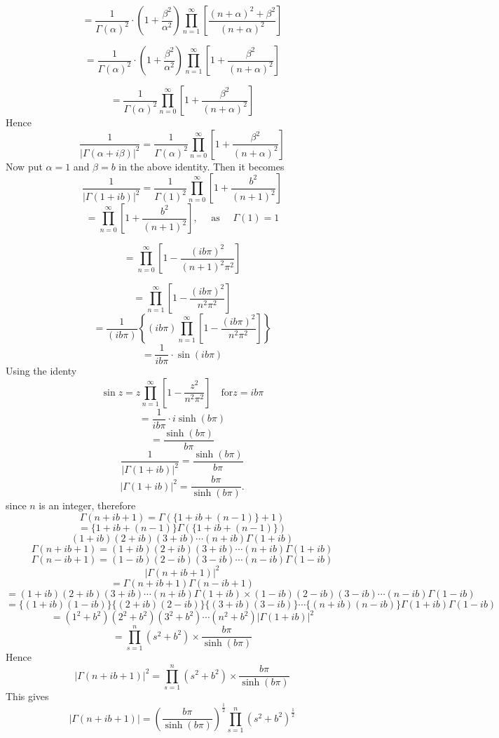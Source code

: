 \documentclass{article}
\begin{document}
\begin{flushleft}
$$
=\frac{1}{\Gamma(\alpha)^{2}} \cdot\left(1+\frac{\beta^{2}}{\alpha^{2}}\right) \prod_{n=1}^{\infty}\left[\frac{(n+\alpha)^{2}+\beta^{2}}{(n+\alpha)^{2}}\right]
$$

$$
=\frac{1}{\Gamma(\alpha)^{2}} \cdot\left(1+\frac{\beta^{2}}{\alpha^{2}}\right) \prod_{n=1}^{\infty}\left[1+\frac{\beta^{2}}{(n+\alpha)^{2}}\right]
$$

$$
=\frac{1}{\Gamma(\alpha)^{2}} \prod_{n=0}^{\infty}\left[1+\frac{\beta^{2}}{(n+\alpha)^{2}}\right]
$$
Hence
$$
\frac{1}{|\Gamma(\alpha+i \beta)|^{2}}=\frac{1}{\Gamma(\alpha)^{2}} \prod_{n=0}^{\infty}\left[1+\frac{\beta^{2}}{(n+\alpha)^{2}}\right]
$$
Now put $\alpha=1$ and $\beta=b$ in the above identity. Then it becomes
$$
\frac{1}{|\Gamma(1+i b)|^{2}}=\frac{1}{\Gamma(1)^{2}} \prod_{n=0}^{\infty}\left[1+\frac{b^{2}}{(n+1)^{2}}\right]
$$
$$
=\prod_{n=0}^{\infty}\left[1+\frac{b^{2}}{(n+1)^{2}}\right], \quad \text { as } \quad \Gamma(1)=1
$$

$$
=\prod_{n=0}^{\infty}\left[1-\frac{(i b \pi)^{2}}{(n+1)^{2} \pi^{2}}\right]
$$

$$
=\prod_{n=1}^{\infty}\left[1-\frac{(i b \pi)^{2}}{n^{2} \pi^{2}}\right]
$$
$$
=\frac{1}{(i b \pi)}\left\{(i b \pi) \prod_{n=1}^{\infty}\left[1-\frac{(i b \pi)^{2}}{n^{2} \pi^{2}}\right]\right\}
$$
$$
=\frac{1}{i b \pi} \cdot \sin (i b \pi)
$$
Using the identy
$$
\sin z=z \prod_{n=1}^{\infty}\left[1-\frac{z^{2}}{n^{2} \pi^{2}}\right] \quad \text{for} z=ib\pi
$$
$$=\frac{1}{i b \pi} \cdot i \sinh (b \pi)$$
$$=\frac{\sinh (b \pi)}{b \pi}$$
$$\frac{1}{|\Gamma(1+i b)|^{2}}=\frac{\sinh (b \pi)}{b \pi}$$
$$|\Gamma(1+i b)|^{2}=\frac{b \pi}{\sinh (b \pi)} .$$
since $n$ is an integer, therefore
$$\Gamma(n+i b+1)=\Gamma(\{1+i b+(n-1)\}+1)$$
$$=\{1+i b+(n-1)\} \Gamma(\{1+i b+(n-1)\})$$
$$
(1+i b)(2+i b)(3+i b) \cdots(n+i b) \Gamma(1+i b)
$$
$$
\Gamma(n+i b+1)=(1+i b)(2+i b)(3+i b) \cdots(n+i b) \Gamma(1+i b)
$$
$$
\Gamma(n-i b+1)=(1-i b)(2-i b)(3-i b) \cdots(n-i b) \Gamma(1-i b)
$$
$$|\Gamma(n+i b+1)|^{2}$$
$$=\Gamma(n+i b+1) \Gamma(n-i b+1)$$
$$=(1+i b)(2+i b)(3+i b) \cdots(n+i b) \Gamma(1+i b) \times(1-i b)(2-i b)(3-i b) \cdots(n-i b) \Gamma(1-i b)$$
$$=\{(1+i b)(1-i b)\}\{(2+i b)(2-i b)\}\{(3+i b)(3-i b)\} \cdots\{(n+i b)(n-i b)\} \Gamma(1+i b) \Gamma(1-i b)$$
$$=\left(1^{2}+b^{2}\right)\left(2^{2}+b^{2}\right)\left(3^{2}+b^{2}\right) \cdots\left(n^{2}+b^{2}\right)|\Gamma(1+i b)|^{2}$$
$$
=\prod_{s=1}^{n}\left(s^{2}+b^{2}\right) \times \frac{b \pi}{\sinh (b \pi)}
$$
Hence 
$$|\Gamma(n+i b+1)|^{2}=\prod_{s=1}^{n}\left(s^{2}+b^{2}\right) \times \frac{b \pi}{\sinh (b \pi)}$$
This gives 
$$|\Gamma(n+i b+1)|=\left(\frac{b \pi}{\sinh (b \pi)}\right)^{\frac{1}{2}} \prod_{s=1}^{n}\left(s^{2}+b^{2}\right)^{\frac{1}{2}} $$




\end{flushleft}
\end{document}
